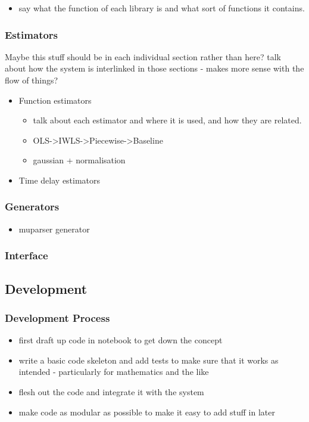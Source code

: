 \documentclass[a4paper,11pt]{article}
\begin{document}
\begin{itemize}
\item say what the function of each library is and what sort of functions it
      contains.
\end{itemize}
\subsubsection{Estimators}
\label{sec-3-1-3}

Maybe this stuff should be in each individual section rather than here? talk
about how the system is interlinked in those sections - makes more sense with
the flow of things?
\begin{itemize}

\item Function estimators
\label{sec-3-1-3-1}%
\begin{itemize}
\item talk about each estimator and where it is used, and how they are related.
\item OLS->IWLS->Piecewise->Baseline
\item gaussian + normalisation
\end{itemize}

\item Time delay estimators
\label{sec-3-1-3-2}%
\end{itemize} %
\subsubsection{Generators}
\label{sec-3-1-4}

\begin{itemize}
\item muparser generator
\end{itemize}
\subsubsection{Interface}
\label{sec-3-1-5}
\subsection{Development}
\label{sec-3-2}
\subsubsection{Development Process}
\label{sec-3-2-1}

\begin{itemize}
\item first draft up code in notebook to get down the concept
\item write a basic code skeleton and add tests to make sure that it works as
  intended - particularly for mathematics and the like
\item flesh out the code and integrate it with the system
\item make code as modular as possible to make it easy to add stuff in later
\end{itemize}
\end{document}
